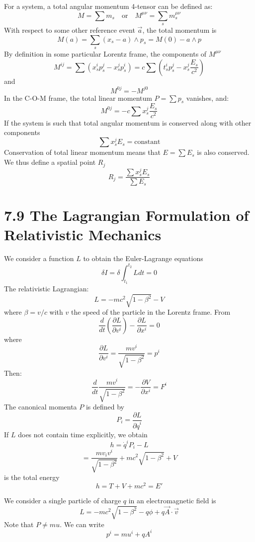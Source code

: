 \documentclass{article}
\begin{document}
    For a system, a total angular momentum 4-tensor can be defined as:
    $$ M = \sum m_s \quad \text{or} \quad M^{\mu\nu} = \sum_s m_s^{\mu\nu} $$
    With respect to some other reference event $\vec{a}$, the total momentum is
    $$ M(a) = \sum_s (x_s - a) \wedge p_s = M(0) - a \wedge p $$
    By definition in some particular Lorentz frame, the components of $M^{\mu\nu}$
    $$ M^{ij} = \sum (x_s^i p_s^j - x_s^j p_s^i) = c \sum (t_s^i p_s^j - x_s^j \frac{E_s}{c^2}) $$
    and
    $$ M^{0j} = - M^{j0} $$
    In the C-O-M frame, the total linear momentum $P = \sum p_s$ vanishes, and:
    $$ M^{0j} = -c \sum x_s^j \frac{E_s}{c^2} $$
    If the system is such that total angular momentum is conserved along with other components
    $$ \sum x_s^j E_s = \text{constant} $$
    Conservation of total linear momentum means that $E = \sum E_s$ is also conserved.
    We thus define a spatial point $R_j$
    $$ R_j = \frac{\sum x_s^j E_s}{\sum E_s} $$
    
    \section*{7.9 The Lagrangian Formulation of Relativistic Mechanics}
    
    We consider a function $L$ to obtain the Euler-Lagrange equations
    $$ \delta I = \delta \int_{t_1}^{t_2} L dt = 0 $$
    The relativistic Lagrangian:
    $$ L = -m c^2 \sqrt{1 - \beta^2} - V $$
    where $\beta=v/c$ with $v$ the speed of the particle in the Lorentz frame.
    From
    $$ \frac{d}{dt} \left( \frac{\partial L}{\partial v^i} \right) - \frac{\partial L}{\partial x^i} = 0 $$
    where
    $$ \frac{\partial L}{\partial v^i} = \frac{m v^i}{\sqrt{1-\beta^2}} = p^i $$
    Then:
    $$ \frac{d}{dt} \frac{m v^i}{\sqrt{1-\beta^2}} = -\frac{\partial V}{\partial x^i} = F^i $$
    The canonical momenta $P$ is defined by
    $$ P_i = \frac{\partial L}{\partial \dot{q}^i} $$
    If $L$ does not contain time explicitly, we obtain
    $$ h = \dot{q}^i P_i - L $$
    $$ = \frac{m v_i v^i}{\sqrt{1-\beta^2}} + mc^2 \sqrt{1-\beta^2} + V $$
    is the total energy
    $$ h = T + V + mc^2 = E' $$
    
    We consider a single particle of charge $q$ in an electromagnetic field is
    $$ L = -mc^2 \sqrt{1-\beta^2} - q\phi + q\vec{A} \cdot \vec{v} $$
    Note that $P \neq mu$.
    We can write
    $$ p^i = mu^i + qA^i $$
    
\end{document}

